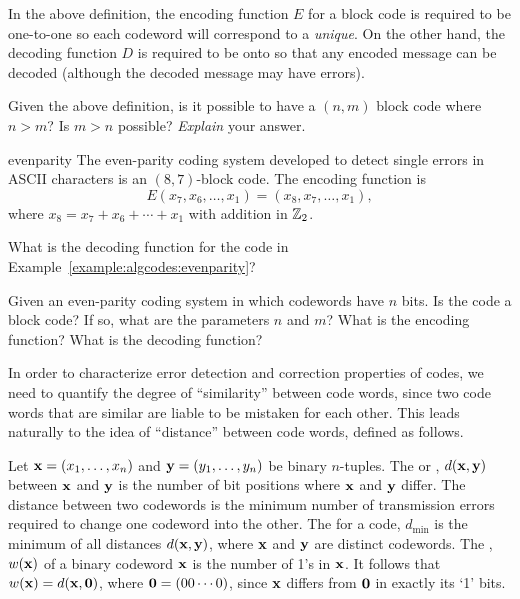 In the above definition, the encoding function $E$ for a block code is required to be one-to-one so each codeword will correspond to a \emph{unique}. On the other hand, the decoding function $D$  is required to be onto so that any encoded message can be decoded (although the decoded message may have errors).

\begin{exercise}{}
Given the above definition, is it possible to have a $(n,m)$ block code where $n > m$? Is $m > n$ possible? \emph{Explain} your answer.
\end{exercise}
 
\begin{example}{evenparity}
The even-parity coding system developed to detect single errors in
ASCII characters is an $(8,7)$-block code. The encoding function is
\[
E(x_7, x_6, \ldots, x_1) = (x_8, x_7,  \ldots, x_1),
\]
where $x_8 = x_7 + x_6 + \cdots + x_1$ with addition in ${\Bbb Z}_2$. 
\end{example}
\begin{exercise}{}
What is the decoding function for the code in Example~\ref{example:algcodes:evenparity}?
\end{exercise}
\begin{exercise}{}
Given an even-parity coding system in which codewords have $n$ bits.  Is the code a block code? If so, what are the parameters $n$ and $m$? What is the encoding function? What is the decoding function?
\end{exercise}

In order to characterize error detection and correction properties of codes, we need to quantify the degree of ``similarity'' between code words, since two code words that are similar are liable to be mistaken for each other. This leads naturally to the idea of ``distance'' between code words, defined as follows.

\begin{defn}\label{defn:algcodes:weight} 
Let ${\bold x} = (x_1, \ldots, x_n)$ and ${\bold y} = (y_1, \ldots,
y_n)$ be binary $n$-tuples. The  or , $d({\bold x}, {\bold
y})$ between ${\bold x}$ and ${\bold y}$ is
the number of bit positions where ${\bold x}$ and ${\bold y}$ differ. The
distance between two codewords is the minimum number of transmission
errors required to change one codeword into the other. The
 for a code,
$d_{\min}$ is the minimum of all distances
$d({\bold x}, {\bold y})$, where ${\bold x}$ and ${\bold y}$ are
distinct codewords. The ,
$w({\bold x})$ of a binary codeword ${\bold x}$ is
the number of 1's in ${\bold x}$. It follows that $w({\bold x}) = d({\bold
x}, {\bold 0})$, where ${\bold 0} = (00 \cdots 0)$, since ${\bold x}$ differs from ${\bold 0}$ in exactly its `1' bits.
\end{defn} 
 
